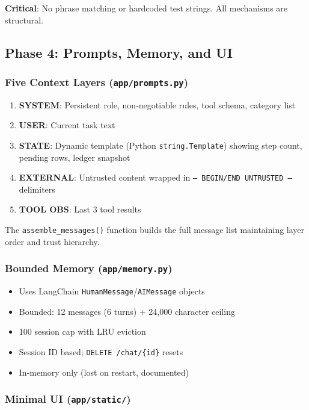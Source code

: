 \documentclass[12pt,a4paper]{article}
\begin{document}
\textbf{Critical}: No phrase matching or hardcoded test strings. All mechanisms are structural.

\subsection{Phase 4: Prompts, Memory, and UI}

\subsubsection{Five Context Layers (\texttt{app/prompts.py})}

\begin{enumerate}
  \item \textbf{SYSTEM}: Persistent role, non-negotiable rules, tool schema, category list
  \item \textbf{USER}: Current task text
  \item \textbf{STATE}: Dynamic template (Python \texttt{string.Template}) showing step count, pending rows, ledger snapshot
  \item \textbf{EXTERNAL}: Untrusted content wrapped in \texttt{--- BEGIN/END UNTRUSTED ---} delimiters
  \item \textbf{TOOL OBS}: Last 3 tool results
\end{enumerate}

The \texttt{assemble\_messages()} function builds the full message list maintaining layer order and trust hierarchy.

\subsubsection{Bounded Memory (\texttt{app/memory.py})}

\begin{itemize}
  \item Uses LangChain \texttt{HumanMessage}/\texttt{AIMessage} objects
  \item Bounded: 12 messages (6 turns) + 24,000 character ceiling
  \item 100 session cap with LRU eviction
  \item Session ID based; \texttt{DELETE /chat/\{id\}} resets
  \item In-memory only (lost on restart, documented)
\end{itemize}

\subsubsection{Minimal UI (\texttt{app/static/})}
\end{document}
